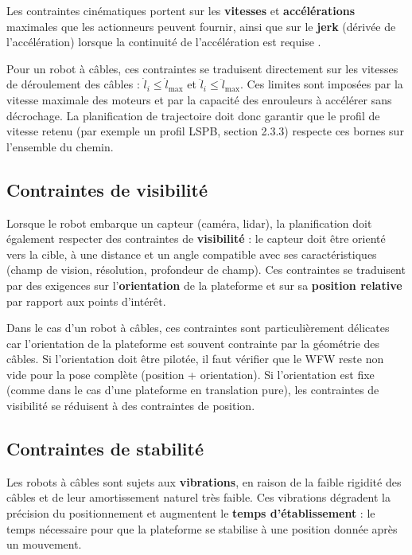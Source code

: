Les contraintes cinématiques portent sur les \textbf{vitesses} et \textbf{accélérations} maximales que les actionneurs peuvent fournir, ainsi que sur le \textbf{jerk} (dérivée de l'accélération) lorsque la continuité de l'accélération est requise \cite{gasparetto2015}.

Pour un robot à câbles, ces contraintes se traduisent directement sur les vitesses de déroulement des câbles : $\dot{l}_i \leq \dot{l}_{\max}$ et $\ddot{l}_i \leq \ddot{l}_{\max}$. Ces limites sont imposées par la vitesse maximale des moteurs et par la capacité des enrouleurs à accélérer sans décrochage. La planification de trajectoire doit donc garantir que le profil de vitesse retenu (par exemple un profil LSPB, section 2.3.3) respecte ces bornes sur l'ensemble du chemin.

\subsection{Contraintes de visibilité}

Lorsque le robot embarque un capteur (caméra, lidar), la planification doit également respecter des contraintes de \textbf{visibilité} : le capteur doit être orienté vers la cible, à une distance et un angle compatible avec ses caractéristiques (champ de vision, résolution, profondeur de champ). Ces contraintes se traduisent par des exigences sur l'\textbf{orientation} de la plateforme et sur sa \textbf{position relative} par rapport aux points d'intérêt.

Dans le cas d'un robot à câbles, ces contraintes sont particulièrement délicates car l'orientation de la plateforme est souvent contrainte par la géométrie des câbles. Si l'orientation doit être pilotée, il faut vérifier que le WFW reste non vide pour la pose complète (position + orientation). Si l'orientation est fixe (comme dans le cas d'une plateforme en translation pure), les contraintes de visibilité se réduisent à des contraintes de position.

\subsection{Contraintes de stabilité}

Les robots à câbles sont sujets aux \textbf{vibrations}, en raison de la faible rigidité des câbles et de leur amortissement naturel très faible. Ces vibrations dégradent la précision du positionnement et augmentent le \textbf{temps d'établissement} : le temps nécessaire pour que la plateforme se stabilise à une position donnée après un mouvement.

